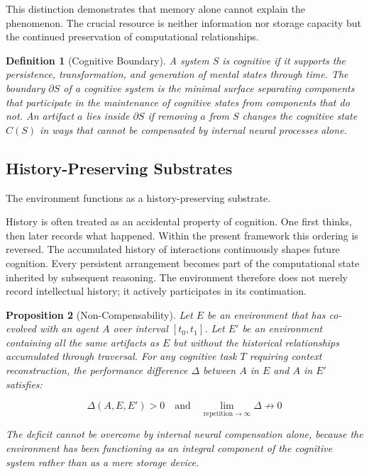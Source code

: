 \documentclass[12pt,oneside]{article}
\newtheorem{definition}{Definition}[section]
\newtheorem{proposition}[definition]{Proposition}
\theoremstyle{remark}
\begin{document}
This distinction demonstrates that memory alone cannot explain the phenomenon. The crucial resource is neither information nor storage capacity but the continued preservation of computational relationships.

\begin{definition}[Cognitive Boundary]
A system $S$ is cognitive if it supports the persistence, transformation, and generation of mental states through time. The boundary $\partial S$ of a cognitive system is the minimal surface separating components that participate in the maintenance of cognitive states from components that do not. An artifact $a$ lies inside $\partial S$ if removing $a$ from $S$ changes the cognitive state $C(S)$ in ways that cannot be compensated by internal neural processes alone.
\end{definition}

\subsection{History-Preserving Substrates}

The environment functions as a history-preserving substrate.

History is often treated as an accidental property of cognition. One first thinks, then later records what happened. Within the present framework this ordering is reversed. The accumulated history of interactions continuously shapes future cognition. Every persistent arrangement becomes part of the computational state inherited by subsequent reasoning. The environment therefore does not merely record intellectual history; it actively participates in its continuation.

\begin{proposition}[Non-Compensability]
Let $E$ be an environment that has co-evolved with an agent $A$ over interval $[t_0, t_1]$. Let $E'$ be an environment containing all the same artifacts as $E$ but without the historical relationships accumulated through traversal. For any cognitive task $T$ requiring context reconstruction, the performance difference $\Delta$ between $A$ in $E$ and $A$ in $E'$ satisfies:

\begin{equation}
\Delta(A, E, E') > 0 \quad \text{and} \quad \lim_{\text{repetition} \to \infty} \Delta \not\to 0
\end{equation}

The deficit cannot be overcome by internal neural compensation alone, because the environment has been functioning as an integral component of the cognitive system rather than as a mere storage device.
\end{proposition}
\end{document}
